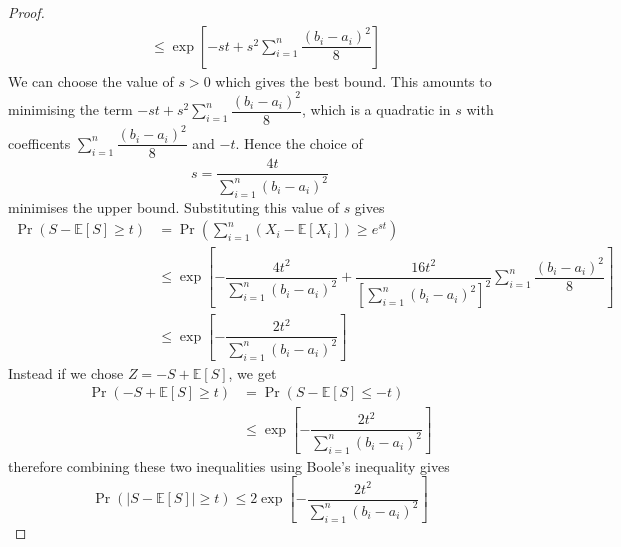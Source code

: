\documentclass[11pt]{report} %
\begin{document}
\begin{proof}
\begin{align}
&\leq \exp\left[-st + s^{2}\sum_{i = 1}^{n}\dfrac{\left(b_{i} - a_{i}\right)^{2}}{8}\right]
\end{align}
We can choose the value of $s > 0$ which gives the best bound. This amounts to minimising the term $-st + s^{2}\sum_{i = 1}^{n}\dfrac{\left(b_{i} - a_{i}\right)^{2}}{8}$, which is a quadratic in $s$ with coefficents $\sum_{i = 1}^{n}\dfrac{\left(b_{i} - a_{i}\right)^{2}}{8}$ and $-t$. Hence the choice of
\begin{equation}
s = \dfrac{4t}{\sum_{i = 1}^{n}\left(b_{i} - a_{i}\right)^{2}}
\end{equation}
minimises the upper bound. Substituting this value of $s$ gives
\begin{align}
\operatorname{Pr}\left(S - \mathbb{E}\left[S\right] \geq t\right)  &= \operatorname{Pr}\left(\sum_{i = 1}^{n}\left(X_{i} - \mathbb{E}\left[X_{i}\right]\right) \geq e^{st}\right) \\
&\leq \exp\left[-\dfrac{4t^{2}}{\sum_{i = 1}^{n}\left(b_{i} - a_{i}\right)^{2}} + \dfrac{16t^{2}}{\left[\sum_{i = 1}^{n}\left(b_{i} - a_{i}\right)^{2}\right]^{2}}\sum_{i = 1}^{n}\dfrac{\left(b_{i} - a_{i}\right)^{2}}{8}\right] \\
&\leq \exp\left[-\dfrac{2t^{2}}{\sum_{i = 1}^{n}\left(b_{i} - a_{i}\right)^{2}} \right]
\end{align}
Instead if we chose $Z = -S + \mathbb{E}\left[S\right]$, we get
\begin{align}
\operatorname{Pr}\left(-S + \mathbb{E}\left[S\right] \geq t\right) &= \operatorname{Pr}\left(S - \mathbb{E}\left[S\right] \leq -t\right) \\
&\leq \exp\left[-\dfrac{2t^{2}}{\sum_{i = 1}^{n}\left(b_{i} - a_{i}\right)^{2}} \right]
\end{align}
therefore combining these two inequalities using Boole's inequality gives
\begin{equation}
\operatorname{Pr}\left(\left|S - \mathbb{E}\left[S\right]\right| \geq t\right) \leq 2\exp\left[-\dfrac{2t^{2}}{\sum_{i = 1}^{n}\left(b_{i} - a_{i}\right)^{2}} \right]
\end{equation}
\end{proof}
\end{document}

